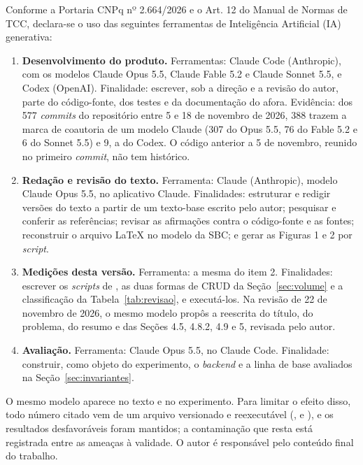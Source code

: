 \documentclass[a4paper,12pt]{article}
\newcommand{\estr}[1]{\textit{#1}}
\begin{document}
Conforme a Portaria CNPq nº 2.664/2026 e o Art. 12 do Manual de Normas de TCC, declara-se o uso das seguintes ferramentas de Inteligência Artificial (IA) generativa:
\begin{enumerate}
  \item \textbf{Desenvolvimento do produto.} Ferramentas: Claude Code (Anthropic), com os modelos Claude Opus 5.5, Claude Fable 5.2 e Claude Sonnet 5.5, e Codex (OpenAI). Finalidade: escrever, sob a direção e a revisão do autor, parte do código-fonte, dos testes e da documentação do afora. Evidência: dos 577 \estr{commits} do repositório entre 5 e 18 de novembro de 2026, 388 trazem a marca de coautoria de um modelo Claude (307 do Opus 5.5, 76 do Fable 5.2 e 6 do Sonnet 5.5) e 9, a do Codex. O código anterior a 5 de novembro, reunido no primeiro \estr{commit}, não tem histórico.
  \item \textbf{Redação e revisão do texto.} Ferramenta: Claude (Anthropic), modelo Claude Opus 5.5, no aplicativo Claude. Finalidades: estruturar e redigir versões do texto a partir de um texto-base escrito pelo autor; pesquisar e conferir as referências; revisar as afirmações contra o código-fonte e as fontes; reconstruir o arquivo \LaTeX{} no modelo da SBC; e gerar as Figuras 1 e 2 por \estr{script}.
  \item \textbf{Medições desta versão.} Ferramenta: a mesma do item 2. Finalidades: escrever os \estr{scripts} de , as duas formas de CRUD da Seção~\ref{sec:volume} e a classificação da Tabela~\ref{tab:revisao}, e executá-los. Na revisão de 22 de novembro de 2026, o mesmo modelo propôs a reescrita do título, do problema, do resumo e das Seções 4.5, 4.8.2, 4.9 e 5, revisada pelo autor.
  \item \textbf{Avaliação.} Ferramenta: Claude Opus 5.5, no Claude Code. Finalidade: construir, como objeto do experimento, o \estr{backend} e a linha de base avaliados na Seção~\ref{sec:invariantes}.
\end{enumerate}
O mesmo modelo aparece no texto e no experimento. Para limitar o efeito disso, todo número citado vem de um arquivo versionado e reexecutável (,  e ), e os resultados desfavoráveis foram mantidos; a contaminação que resta está registrada entre as ameaças à validade. O autor é responsável pelo conteúdo final do trabalho.
\end{document}
